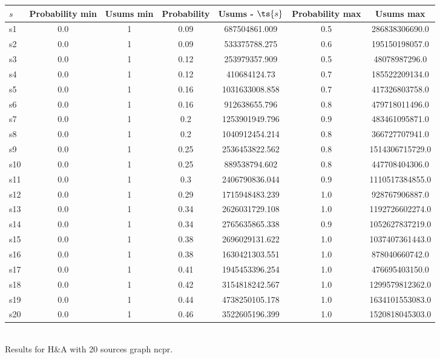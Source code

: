 \documentclass{article}
\begin{document}
\noindent\begin{tabular}{|l|c|c|c|c|c|c|}
\hline
$s$& Probability min & Usums min & Probability & Usums - $\ts{s}$ & Probability max & Usums max\\
\hline
s1 &0.0 & 1 & 0.09 & 687504861.009 & 0.5 & 286838306690.0\\
\hline
s2 &0.0 & 1 & 0.09 & 533375788.275 & 0.6 & 195150198057.0\\
\hline
s3 &0.0 & 1 & 0.12 & 253979357.909 & 0.5 & 48078987296.0\\
\hline
s4 &0.0 & 1 & 0.12 & 410684124.73 & 0.7 & 185522209134.0\\
\hline
s5 &0.0 & 1 & 0.16 & 1031633008.858 & 0.7 & 417326803758.0\\
\hline
s6 &0.0 & 1 & 0.16 & 912638655.796 & 0.8 & 479718011496.0\\
\hline
s7 &0.0 & 1 & 0.2 & 1253901949.796 & 0.9 & 483461095871.0\\
\hline
s8 &0.0 & 1 & 0.2 & 1040912454.214 & 0.8 & 366727707941.0\\
\hline
s9 &0.0 & 1 & 0.25 & 2536453822.562 & 0.8 & 1514306715729.0\\
\hline
s10 &0.0 & 1 & 0.25 & 889538794.602 & 0.8 & 447708404306.0\\
\hline
s11 &0.0 & 1 & 0.3 & 2406790836.044 & 0.9 & 1110517384855.0\\
\hline
s12 &0.0 & 1 & 0.29 & 1715948483.239 & 1.0 & 928767906887.0\\
\hline
s13 &0.0 & 1 & 0.34 & 2626031729.108 & 1.0 & 1192726602274.0\\
\hline
s14 &0.0 & 1 & 0.34 & 2765635865.338 & 0.9 & 1052627837219.0\\
\hline
s15 &0.0 & 1 & 0.38 & 2696029131.622 & 1.0 & 1037407361443.0\\
\hline
s16 &0.0 & 1 & 0.38 & 1630421303.551 & 1.0 & 878040660742.0\\
\hline
s17 &0.0 & 1 & 0.41 & 1945453396.254 & 1.0 & 476695403150.0\\
\hline
s18 &0.0 & 1 & 0.42 & 3154818242.567 & 1.0 & 1299579812362.0\\
\hline
s19 &0.0 & 1 & 0.44 & 4738250105.178 & 1.0 & 1634101553083.0\\
\hline
s20 &0.0 & 1 & 0.46 & 3522605196.399 & 1.0 & 1520818045303.0\\
\hline
\end{tabular}\\

\noindent Results for H\&A with 20 sources graph ncpr.
\end{document}
